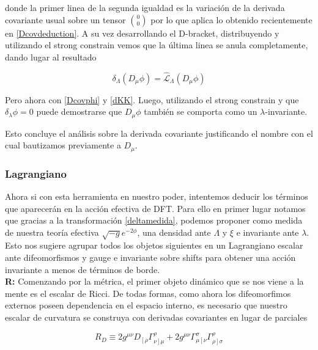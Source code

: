 \documentclass{article}
\numberwithin{equation}{section}
\begin{document}
donde la primer linea de la segunda igualdad es la variación de la derivada covariante usual sobre un tensor $ \binom{0}{0} $ por lo que aplica lo obtenido recientemente en \ref{Dcovdeduction}. A su vez desarrollando el D-bracket, distribuyendo y utilizando el strong constrain vemos que la última linea se anula completamente, dando lugar al resultado\\

\begin{boxeq}
	\begin{equation}\label{Dphiescalar}
	\delta_{\Lambda} \left( D_{\mu} \phi \right) = \hat{\mathcal{L}}_{\Lambda} \left( D_{\mu} \phi \right)
	\end{equation}
\end{boxeq}


Pero ahora con \ref{Dcovphi} y \ref{dKK}. Luego, utilizando el strong constrain y que $ \delta_{\lambda} \phi = 0 $ puede demostrarse que $ D_{\mu} \phi $ también se comporta como un $ \lambda$-invariante.

Esto concluye el análisis sobre la derivada covariante justificando el nombre con el cual bautizamos previamente a $ D_{\mu} $.\\

\subsubsection{Lagrangiano}

Ahora si con esta herramienta en nuestro poder, intentemos deducir los términos que aparecerán en la acción efectiva de DFT. Para ello en primer lugar notamos que gracias a la transformación \ref{deltamedida}, podemos proponer como medida de nuestra teoría efectiva $ \sqrt{-g}e^{-2\phi} $, una densidad ante $ \Lambda $ y $ \xi $ e invariante ante $ \lambda $. Esto nos sugiere agrupar todos los objetos siguientes en un Lagrangiano escalar ante difeomorfismos y gauge e invariante sobre shifts para obtener una acción invariante a menos de términos de borde.\\


\textbf{R:} Comenzando por la métrica, el primer objeto dinámico que se nos viene a la mente es el escalar de Ricci. De todas formas, como ahora los difeomorfimos externos poseen dependencia en el espacio interno, es necesario que nuestro escalar de curvatura se construya con derivadas covariantes en lugar de parciales

\begin{equation}\label{riccig}
R_D \equiv 2 g^{\mu \nu} D_{\left[ \rho \right.} \Gamma^{\rho}_{\left. \nu \right] \mu} +   2g^{\mu \nu}\Gamma^{\sigma}_{\mu \left[ \nu \right.}\Gamma^{\rho}_{ \left. \rho \right] \sigma}
\end{equation} 
\end{document}
